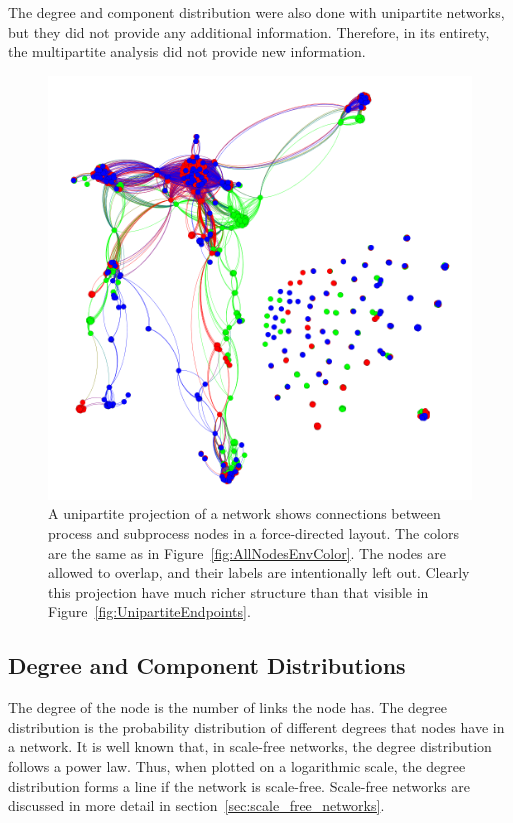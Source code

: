 \documentclass[english, 12pt, a4paper, sci, utf8, a-2b, online, obeyspaces]{aaltothesis}
\begin{document}
The degree and component distribution were also done with unipartite networks, but they did not provide any additional information. Therefore, in its entirety, the multipartite analysis did not provide new information.

\begin{figure}[htb]
  \centering
  \includegraphics[width=\textwidth]{pictures/network/UnipartiteProcessEnvColors.png}
  \caption{A unipartite projection of a network shows connections between process and subprocess nodes in a force-directed layout. The colors are the same as in Figure~\ref{fig:AllNodesEnvColor}. The nodes are allowed to overlap, and their labels are intentionally left out. Clearly this projection have much richer structure than that visible in Figure~\ref{fig:UnipartiteEndpoints}.}
  \label{fig:UnipartiteProcessEnvColors}
\end{figure}

\clearpage
\subsection{Degree and Component Distributions}
The degree of the node is the number of links the node has. The degree distribution is the probability distribution of different degrees that nodes have in a network. It is well known that, in scale-free networks, the degree distribution follows a power law. Thus, when plotted on a logarithmic scale, the degree distribution forms a line if the network is scale-free. Scale-free networks are discussed in more detail in section~\ref{sec:scale_free_networks}.
\end{document}

